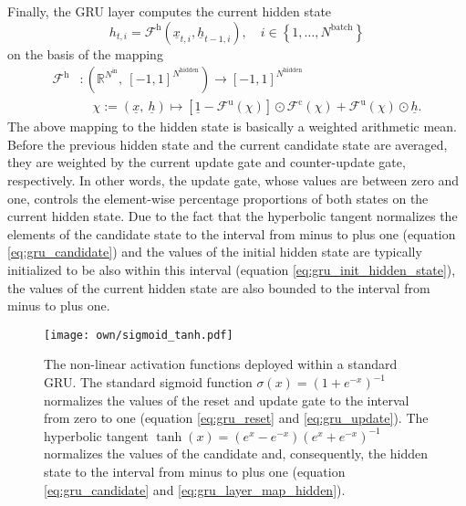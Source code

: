 Finally, the GRU layer computes the current hidden state
\begin{equation} \label{eq:gru_layer_current_hidden}
    h_{t,i}
    =
    \mathcal{F}^\text{h} \left( \underline x_{t,i}, \underline h_{t-1,i}\right)
    ,\quad i \in \left\{1, \dots, N^\text{batch}\right\}
\end{equation}
on the basis of the mapping
\begin{align} \label{eq:gru_layer_map_hidden}
    \mathcal{F}^\text{h}
    &:
    \left(
        \mathbb{R}^{N^\text{in}}
        ,\ 
        \left[-1, 1\right]^{N^\text{hidden}}
    \right)
    \rightarrow
    \left[-1, 1\right]^{N^\text{hidden}}
    \nonumber \\ & \quad
    \chi := \left(
        \underline x
        ,\ 
        \underline h
    \right)
    \mapsto 
    \left[
        \underline 1 
        -
        \mathcal{F}^\text{u}\left(\chi\right)
    \right]
    \odot
    \mathcal{F}^\text{c} \left(\chi\right)
    +
    \mathcal{F}^\text{u}\left(\chi\right)
    \odot
    \underline h
    .
\end{align}
The above mapping to the hidden state is basically a weighted arithmetic mean.
Before the previous hidden state
and the current candidate state are averaged,
they are weighted by the current update gate and counter-update gate, respectively.
In other words,
the update gate,
whose values are between zero and one,
controls the element-wise percentage proportions of both states
on the current hidden state.
Due to the fact that the hyperbolic tangent
normalizes the elements of the candidate state to the interval from 
minus to plus one (equation \ref{eq:gru_candidate})
and the values of the initial hidden state
are typically initialized to be also within this interval
(equation \ref{eq:gru_init_hidden_state}),
the values of the current hidden state are
also bounded to the interval from minus to plus one.


\begin{figure}
    \centering
    \texttt{[image: own/sigmoid\_tanh.pdf]}
    \caption[
        The non-linear activation functions deployed within a standard GRU
    ]{
        The non-linear activation functions deployed within a standard GRU.
        The standard sigmoid function
        $\sigma (x) = \left(1 + e^{-x}\right)^{-1}$
        normalizes the values
        of the reset and update
        gate to the interval from zero to one
        (equation \ref{eq:gru_reset} and \ref{eq:gru_update}).
        The hyperbolic tangent
        $\tanh \left(x\right) = \left(e^x - e^{-x}\right)\left(e^x + e^{-x}\right)^{-1}$
        normalizes the values 
        of the candidate
        and, consequently, the hidden state 
        to the interval from minus to plus one
        (equation \ref{eq:gru_candidate} and \ref{eq:gru_layer_map_hidden}).
        \label{fig:gru_activations}}
\end{figure}



